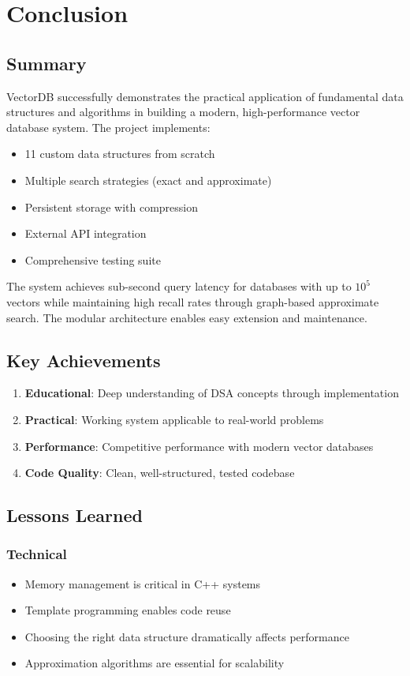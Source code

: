 \documentclass[12pt,a4paper]{article}
\begin{document}
\section{Conclusion}

\subsection{Summary}
VectorDB successfully demonstrates the practical application of fundamental data structures and algorithms in building a modern, high-performance vector database system. The project implements:

\begin{itemize}
    \item 11 custom data structures from scratch
    \item Multiple search strategies (exact and approximate)
    \item Persistent storage with compression
    \item External API integration
    \item Comprehensive testing suite
\end{itemize}

The system achieves sub-second query latency for databases with up to $10^5$ vectors while maintaining high recall rates through graph-based approximate search. The modular architecture enables easy extension and maintenance.

\subsection{Key Achievements}

\begin{enumerate}
    \item \textbf{Educational}: Deep understanding of DSA concepts through implementation
    \item \textbf{Practical}: Working system applicable to real-world problems
    \item \textbf{Performance}: Competitive performance with modern vector databases
    \item \textbf{Code Quality}: Clean, well-structured, tested codebase
\end{enumerate}

\subsection{Lessons Learned}

\subsubsection{Technical}
\begin{itemize}
    \item Memory management is critical in C++ systems
    \item Template programming enables code reuse
    \item Choosing the right data structure dramatically affects performance
    \item Approximation algorithms are essential for scalability
\end{itemize}
\end{document}
